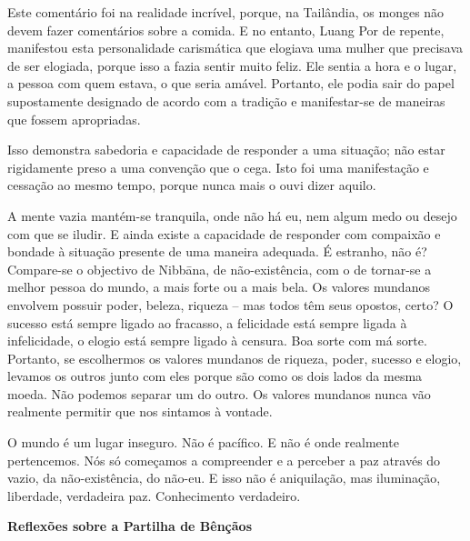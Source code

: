 Este comentário foi na realidade incrível, porque, na Tailândia, os monges não
devem fazer comentários sobre a comida. E no entanto, Luang Por de repente,
manifestou esta personalidade carismática que elogiava uma mulher que precisava
de ser elogiada, porque isso a fazia sentir muito feliz. Ele sentia a hora e o
lugar, a pessoa com quem estava, o que seria amável. Portanto, ele podia sair do
papel supostamente designado de acordo com a tradição e manifestar-se de
maneiras que fossem apropriadas.

Isso demonstra sabedoria e capacidade de responder a uma situação; não estar
rigidamente preso a uma convenção que o cega. Isto foi uma manifestação e
cessação ao mesmo tempo, porque nunca mais o ouvi dizer aquilo.

A mente vazia mantém-se tranquila, onde não há eu, nem algum medo ou desejo com
que se iludir. E ainda existe a capacidade de responder com compaixão e bondade
à situação presente de uma maneira adequada. É estranho, não é? Compare-se o
objectivo de Nibbāna, de não-existência, com o de tornar-se a melhor pessoa do
mundo, a mais forte ou a mais bela. Os valores mundanos envolvem possuir poder,
beleza, riqueza -- mas todos têm seus opostos, certo? O sucesso está sempre
ligado ao fracasso, a felicidade está sempre ligada à infelicidade, o elogio
está sempre ligado à censura. Boa sorte com má sorte. Portanto, se escolhermos
os valores mundanos de riqueza, poder, sucesso e elogio, levamos os outros junto
com eles porque são como os dois lados da mesma moeda. Não podemos separar um do
outro. Os valores mundanos nunca vão realmente permitir que nos sintamos à
vontade.

O mundo é um lugar inseguro. Não é pacífico. E não é onde realmente pertencemos.
Nós só começamos a compreender e a perceber a paz através do vazio, da
não-existência, do não-eu. E isso não é aniquilação, mas iluminação, liberdade,
verdadeira paz. Conhecimento verdadeiro.


\textbf{Reflexões sobre a Partilha de Bênçãos}


